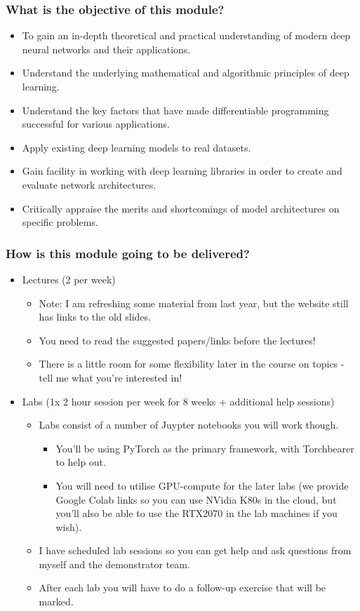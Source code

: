 \documentclass[\beamerclass]{beamer}
\begin{document}
\begin{frame}
	\frametitle{What is the objective of this module?}
	\begin{itemize}
		\item<+-> To gain an in-depth theoretical and practical understanding of modern deep neural networks and their applications.
		\item<+-> Understand the underlying mathematical and algorithmic principles of deep learning.
		\item<+-> Understand the key factors that have made differentiable programming successful for various applications.
		\item<+-> Apply existing deep learning models to real datasets.
		\item<+-> Gain facility in working with deep learning libraries in order to create and evaluate network architectures.
		\item<+-> Critically appraise the merits and shortcomings of model architectures on specific problems.
	\end{itemize}
\end{frame}

\begin{frame}
	\frametitle{How is this module going to be delivered?}
	
	\begin{itemize}
		\item<+-> Lectures (2 per week)
		\begin{itemize}
			\item Note: I am refreshing some material from last year, but the website still has links to the old slides.
			\item You need to read the suggested papers/links before the lectures!
			\item There is a little room for some flexibility later in the course on topics - tell me what you're interested in!
		\end{itemize}
		\item<+-> Labs (1x 2 hour session per week for 8 weeks + additional help sessions)
		\begin{itemize}
			\item Labs consist of a number of Juypter notebooks you will work though.
			\begin{itemize}
				\item You'll be using PyTorch as the primary framework, with Torchbearer to help out.
				\item You will need to utilise GPU-compute for the later labs (we provide Google Colab links so you can use NVidia K80s in the cloud, but you'll also be able to use the RTX2070 in the lab machines if you wish).
			\end{itemize}
			\item I have scheduled lab sessions so you can get help and ask questions from myself and the demonstrator team.
			\item After each lab you will have to do a follow-up exercise that will be marked.
		\end{itemize}
	\end{itemize}
\end{frame}
\end{document}
